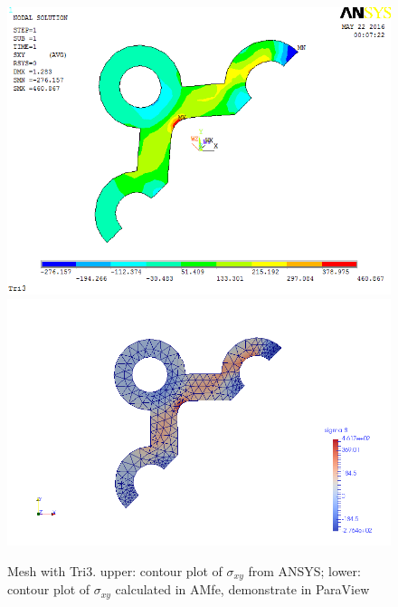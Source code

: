 \begin{figure}[htbp]
	\begin{center}
		\includegraphics[width=13cm,clip]{TTri3_Sxy.png} 		
		\includegraphics[width=13cm,clip]{TTri3_Sxy_P.png} 		
		\caption{Mesh with Tri3. upper: contour plot of $\sigma_{xy}$ from ANSYS; lower: contour plot of $\sigma_{xy}$ calculated in AMfe, demonstrate in ParaView} \label{fig: Tri3_Sxy}
	\end{center}
\end{figure}
\clearpage 

